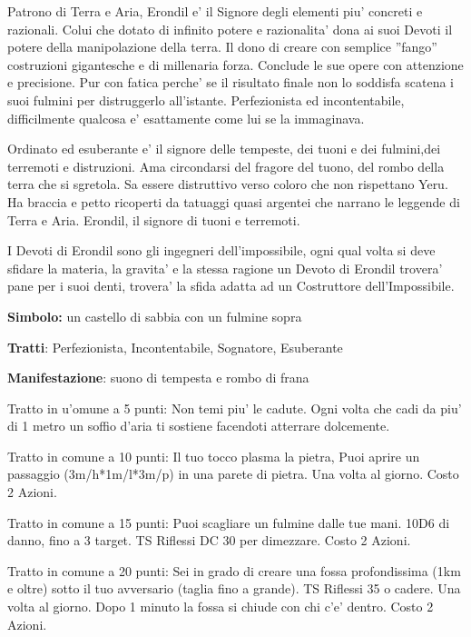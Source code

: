 \documentclass[a4paper,11pt,twoside,openany]{book}
\begin{document}
{\label{erondil}

Patrono di Terra e Aria, Erondil e' il Signore degli elementi piu' concreti e razionali. Colui che dotato di infinito potere e razionalita' dona ai suoi Devoti il potere della manipolazione della terra. Il dono di creare con semplice ''fango'' costruzioni gigantesche e di millenaria forza. Conclude le sue opere con attenzione e precisione. Pur con fatica perche' se il risultato finale non lo soddisfa scatena i suoi fulmini per distruggerlo all'istante. Perfezionista ed incontentabile, difficilmente qualcosa e' esattamente come lui se la immaginava. 

Ordinato ed esuberante e' il signore delle tempeste, dei tuoni e dei fulmini,dei terremoti e distruzioni. Ama circondarsi del fragore del tuono, del rombo della terra che si sgretola. Sa essere distruttivo verso coloro che non rispettano Yeru.
Ha braccia e petto ricoperti da tatuaggi quasi argentei che narrano le leggende di Terra e Aria. Erondil, il signore di tuoni e terremoti.


I Devoti di Erondil sono gli ingegneri dell'impossibile, ogni qual volta si deve sfidare la materia, la gravita' e la stessa ragione un Devoto di Erondil trovera' pane per i suoi denti, trovera' la sfida adatta ad un Costruttore dell'Impossibile.

\textbf{Simbolo:} un castello di sabbia con un fulmine sopra

\textbf{Tratti}: Perfezionista, Incontentabile, Sognatore, Esuberante

\textbf{Manifestazione}: suono di tempesta e rombo di frana

\bigskip

Tratto in u'omune a 5 punti: Non temi piu' le cadute. Ogni volta che cadi da piu' di 1 metro un soffio d'aria ti sostiene facendoti atterrare dolcemente.

Tratto in comune a 10 punti: Il tuo tocco plasma la pietra, Puoi aprire un passaggio (3m/h{*}1m/l{*}3m/p) in una parete di pietra. Una volta al giorno. Costo 2 Azioni.

Tratto in comune a 15 punti: Puoi scagliare un fulmine dalle tue mani. 10D6 di danno, fino a 3 target. TS Riflessi DC 30 per dimezzare. Costo 2 Azioni.

Tratto in comune a 20 punti: Sei in grado di creare una fossa profondissima (1km e oltre) sotto il tuo avversario (taglia fino a grande). TS Riflessi 35 o cadere. Una volta al giorno. Dopo 1 minuto la fossa si chiude con chi c'e' dentro. Costo 2 Azioni.

}
\end{document}
